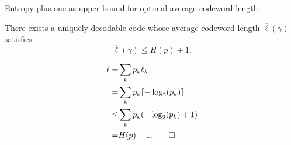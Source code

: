 \begin{frame}{Entropy plus one as upper bound for optimal average codeword length}
\begin{proposition}
There exists a uniquely decodable code whose average codeword length $\overline{\ell}(\gamma)$ satisfies
\begin{equation*}
\overline{\ell}(\gamma)\leq H(p)+1.
\end{equation*}
\end{proposition}
{}
\begin{align*}
\overline{\ell}=&\sum_kp_k\ell_k \\ =&\sum_kp_k\lceil-\log_2({p_k})\rceil\\ \leq &\sum_kp_k(-\log_2({p_k})+1) 
\\ =&H(p)+1.\qed 
\end{align*}
\end{frame} 



